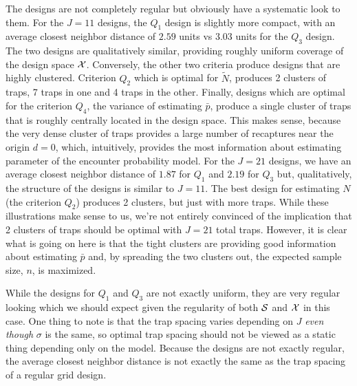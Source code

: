 The designs are not completely regular but obviously have a systematic
look to them. For the $J=11$ designs, the $Q_{1}$ design is slightly
more compact, with an average closest neighbor distance of $2.59$
units vs $3.03$ units for the $Q_{3}$ design. The two designs are
qualitatively similar, providing roughly uniform coverage of the
design space ${\cal X}$.  Conversely, the other two criteria produce
designs that are highly clustered.  Criterion $Q_{2}$ which is optimal
for $\tilde{N}$, produces 2
clusters of traps, 7 traps in one and 4 traps in the other. Finally,
designs which are optimal for the criterion $Q_{4}$, the variance of
estimating $\bar{p}$, produce a single cluster of traps that is
roughly centrally located in the design space. This makes sense,
because the very dense cluster of traps provides a large number of
recaptures near the origin $d=0$, which, intuitively, provides the most information
about estimating parameter of the encounter probability model. 
 For the $J=21$ designs, we have an average closest neighbor
distance of $1.87$ for $Q_{1}$ and $2.19$ for $Q_{3}$ but,
qualitatively, the structure of the designs is similar to $J=11$. The
best design for estimating $N$ (the criterion $Q_{2}$) produces 2
clusters, but just with more traps. While these illustrations
  make sense to us, we're not entirely convinced of the implication
  that 2 clusters of traps should be optimal with $J=21$ total
  traps. However, it is clear what is going on here is that the tight
  clusters are providing good information about estimating $\bar{p}$
  and, by spreading the two clusters out, the expected sample size,
  $n$, is maximized.

While the designs for $Q_{1}$ and $Q_{3}$ are not exactly uniform, they are very regular
looking which we should expect given the regularity of both ${\cal
  S}$ and ${\cal X}$ in this case.  One thing to note is that the trap
spacing varies depending on $J$ {\it even though} $\sigma$ is the
same, so optimal trap spacing should not be viewed as a static thing
depending only on the model.  Because the designs are not exactly
regular, the average closest neighbor distance is not exactly the same
as the trap spacing of a regular grid design. 



